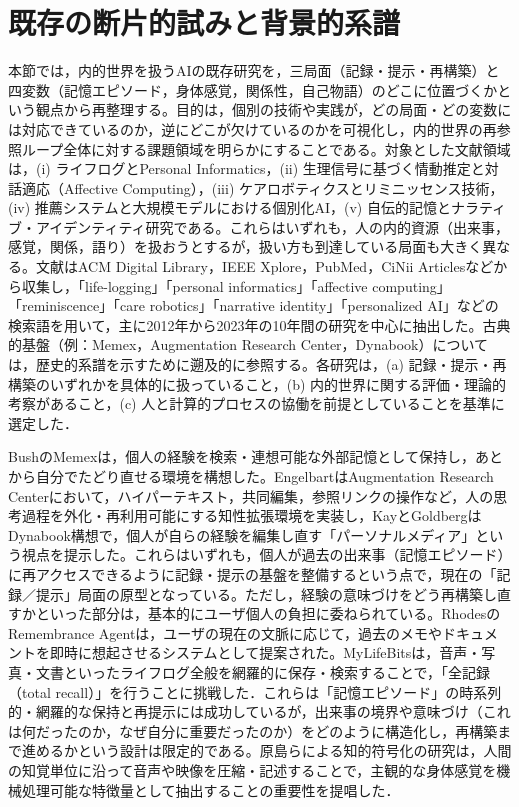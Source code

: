 \documentclass[originalpaper]{jsaiart}
\begin{document}
\section{既存の断片的試みと背景的系譜}\label{sec:related-work}
本節では，内的世界を扱うAIの既存研究を，三局面（記録・提示・再構築）と四変数（記憶エピソード，身体感覚，関係性，自己物語）のどこに位置づくかという観点から再整理する。目的は，個別の技術や実践が，どの局面・どの変数には対応できているのか，逆にどこが欠けているのかを可視化し，内的世界の再参照ループ全体に対する課題領域を明らかにすることである。対象とした文献領域は，(i) ライフログとPersonal Informatics，(ii) 生理信号に基づく情動推定と対話適応（Affective Computing），(iii) ケアロボティクスとリミニッセンス技術，(iv) 推薦システムと大規模モデルにおける個別化AI，(v) 自伝的記憶とナラティブ・アイデンティティ研究である。これらはいずれも，人の内的資源（出来事，感覚，関係，語り）を扱おうとするが，扱い方も到達している局面も大きく異なる。文献はACM Digital Library，IEEE Xplore，PubMed，CiNii Articlesなどから収集し，「life-logging」「personal informatics」「affective computing」「reminiscence」「care robotics」「narrative identity」「personalized AI」などの検索語を用いて，主に2012年から2023年の10年間の研究を中心に抽出した。古典的基盤（例：Memex，Augmentation Research Center，Dynabook）については，歴史的系譜を示すために遡及的に参照する。各研究は，(a) 記録・提示・再構築のいずれかを具体的に扱っていること，(b) 内的世界に関する評価・理論的考察があること，(c) 人と計算的プロセスの協働を前提としていることを基準に選定した．

BushのMemexは，個人の経験を検索・連想可能な外部記憶として保持し，あとから自分でたどり直せる環境を構想した\cite{bush1945}。EngelbartはAugmentation Research Centerにおいて，ハイパーテキスト，共同編集，参照リンクの操作など，人の思考過程を外化・再利用可能にする知性拡張環境を実装し\cite{engelbart1962,engelbart1968}，KayとGoldbergはDynabook構想で，個人が自らの経験を編集し直す「パーソナルメディア」という視点を提示した\cite{kay1977}。これらはいずれも，個人が過去の出来事（記憶エピソード）に再アクセスできるように記録・提示の基盤を整備するという点で，現在の「記録／提示」局面の原型となっている。ただし，経験の意味づけをどう再構築し直すかといった部分は，基本的にユーザ個人の負担に委ねられている。RhodesのRemembrance Agentは，ユーザの現在の文脈に応じて，過去のメモやドキュメントを即時に想起させるシステムとして提案された\cite{rhodes1997}。MyLifeBitsは，音声・写真・文書といったライフログ全般を網羅的に保存・検索することで，「全記録（total recall）」を行うことに挑戦した\cite{gemmell2002}．これらは「記憶エピソード」の時系列的・網羅的な保持と再提示には成功しているが，出来事の境界や意味づけ（これは何だったのか，なぜ自分に重要だったのか）をどのように構造化し，再構築まで進めるかという設計は限定的である。原島らによる知的符号化の研究は，人間の知覚単位に沿って音声や映像を圧縮・記述することで，主観的な身体感覚を機械処理可能な特徴量として抽出することの重要性を提唱した\cite{harashima1996}．
\end{document}
